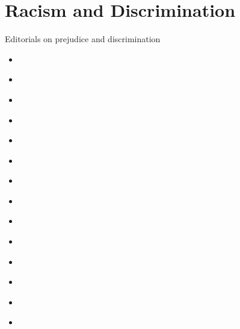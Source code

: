 \documentclass[letterpaper,10pt,english]{jupyterBook}
\begin{document}
\chapter{Racism and Discrimination}
\label{\detokenize{Sections/racism:racism-and-discrimination}}\label{\detokenize{Sections/racism::doc}}
\sphinxAtStartPar
Editorials on prejudice and discrimination
\begin{itemize}
\item {} 
\sphinxAtStartPar
{\hyperref[\detokenize{Volumes/01/03/social_equality::doc}]{}}

\item {} 
\sphinxAtStartPar
{\hyperref[\detokenize{Volumes/01/03/ashamed::doc}]{}}

\item {} 
\sphinxAtStartPar
{\hyperref[\detokenize{Volumes/03/04/light::doc}]{}}

\item {} 
\sphinxAtStartPar
{\hyperref[\detokenize{Volumes/06/02/logic::doc}]{}}

\item {} 
\sphinxAtStartPar
{\hyperref[\detokenize{Volumes/10/01/clansman::doc}]{}}

\item {} 
\sphinxAtStartPar
{\hyperref[\detokenize{Volumes/12/05/conduct_not_color::doc}]{}}

\item {} 
\sphinxAtStartPar
{\hyperref[\detokenize{Volumes/12/06/migration::doc}]{}}

\item {} 
\sphinxAtStartPar
{\hyperref[\detokenize{Volumes/19/01/social_equality::doc}]{}}

\item {} 
\sphinxAtStartPar
{\hyperref[\detokenize{Volumes/24/01/slavery::doc}]{}}

\item {} 
\sphinxAtStartPar
{\hyperref[\detokenize{Volumes/31/04/newer_south::doc}]{}}

\item {} 
\sphinxAtStartPar
{\hyperref[\detokenize{Volumes/34/02/higher_friction::doc}]{}}

\item {} 
\sphinxAtStartPar
{\hyperref[\detokenize{Volumes/34/09/prejudice::doc}]{}}

\item {} 
\sphinxAtStartPar
{\hyperref[\detokenize{Volumes/37/02/about_wailing::doc}]{}}

\item {} 
\sphinxAtStartPar
{\hyperref[\detokenize{Volumes/40/07/protest::doc}]{}}

\end{itemize}
\end{document}
